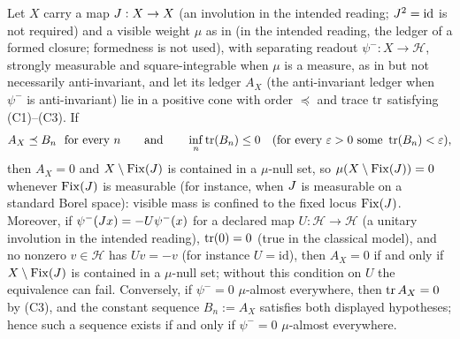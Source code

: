 \begin{theorem}\label{thm:F14}
Let \(X\) carry a map \(J:X\to X\) (an involution in the intended reading; \(J^2=\mathrm{id}\) is not required) and a visible weight \(\mu\) as in  (in the intended reading, the ledger of a formed closure; formedness is not used), with
separating readout \(\psi^-:X\to\mathcal H\), strongly measurable and square-integrable when \(\mu\) is a measure, as in  but not necessarily anti-invariant, and let its
ledger \(A_X\) (the anti-invariant ledger when \(\psi^-\) is anti-invariant) lie in a positive cone with order \(\preceq\) and trace
\(\operatorname{tr}\) satisfying (C1)--(C3). If
\[
  A_X \preceq B_n\ \ \text{for every } n
  \qquad\text{and}\qquad
  \inf_n\operatorname{tr}(B_n)\le 0
  \quad(\text{for every }\varepsilon>0\text{ some }\operatorname{tr}(B_n)<\varepsilon),
\]
then \(A_X=0\) and \(X\setminus\mathrm{Fix}(J)\) is contained in a \(\mu\)-null set,
so \(\mu(X\setminus\mathrm{Fix}(J))=0\) whenever \(\mathrm{Fix}(J)\) is measurable (for
instance, when \(J\) is measurable on a standard Borel space): visible
mass is confined to the fixed locus \(\mathrm{Fix}(J)\). Moreover, if \(\psi^-(J x)=-U\psi^-(x)\) for a declared map \(U:\mathcal H\to\mathcal H\) (a unitary involution in the intended reading), \(\operatorname{tr}(0)=0\) (true in the classical model), and no nonzero \(v\in\mathcal H\) has \(Uv=-v\) (for instance
\(U=\mathrm{id}\)), then \(A_X=0\) if and only if \(X\setminus\mathrm{Fix}(J)\) is
contained in a \(\mu\)-null set; without this condition on \(U\) the
equivalence can fail. Conversely, if \(\psi^-=0\) \(\mu\)-almost everywhere, then \(\operatorname{tr} A_X=0\) by (C3), and the constant sequence \(B_n:=A_X\) satisfies both displayed hypotheses; hence such a sequence exists if and only if \(\psi^-=0\) \(\mu\)-almost everywhere.
\end{theorem}
